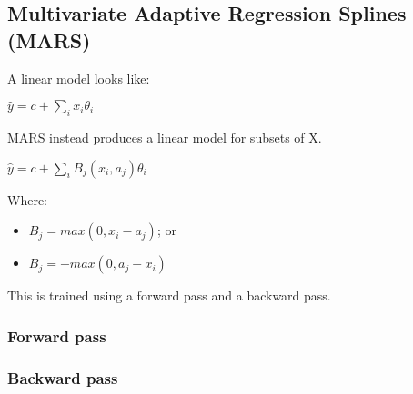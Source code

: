 
\subsection{Multivariate Adaptive Regression Splines (MARS)}

A linear model looks like:

\(\hat y =c+\sum_i x_i\theta_i\)

MARS instead produces a linear model for subsets of X.

\(\hat y =c+\sum_i B_j(x_i,a_j)\theta_i\)

Where:

\begin{itemize}
\item \(B_j=max(0, x_i-a_j)\); or
\item \(B_j=-max(0, a_j-x_i)\)
\end{itemize}

This is trained using a forward pass and a backward pass.

\subsubsection{Forward pass}

\subsubsection{Backward pass}


